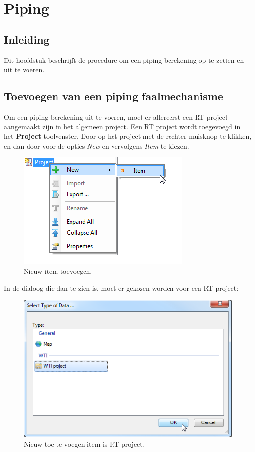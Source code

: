 
\chapter{Piping\label{chap:piping}}

\section{Inleiding}
Dit hoofdstuk beschrijft de procedure om een piping berekening op te zetten en uit te voeren. 

\section{Toevoegen van een piping faalmechanisme}
\label{sec:addpiping}
Om een piping berekening uit te voeren, moet er allereerst een RT project aangemaakt zijn in het algemeen project. Een RT project wordt toegevoegd in het \textbf{Project} toolvenster. Door op het project met de rechter muisknop te klikken, en dan door voor de opties \textit{New} en vervolgens \textit{Item} te kiezen.

\begin{figure} [H]
	\centering
		\includegraphics{figures/chapter_piping/addNewProject}
	\caption{Nieuw item toevoegen.}
	\label{fig:fig5.1}
\end{figure}

In de dialoog die dan te zien is, moet er gekozen worden voor een RT project:

\begin{figure} [H]
	\centering
		\includegraphics{figures/chapter_piping/selectRTProject}
	\caption{Nieuw toe te voegen item is RT project.}
	\label{fig:fig5.2}
\end{figure}

